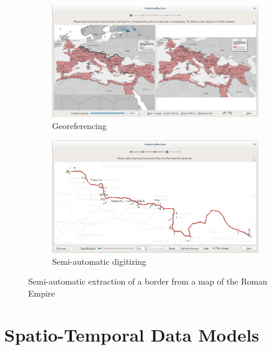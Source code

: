 \begin{figure}[ht]
  \centering
  \begin{subfigure}{0.48\textwidth}
    \centering
    \includegraphics[width=0.95\linewidth]{graphics/basics/hgis/hibo1.png}
    \caption{Georeferencing}
  \end{subfigure}
  \begin{subfigure}{0.48\textwidth}
    \centering
    \includegraphics[width=0.95\linewidth]{graphics/basics/hgis/hibo2.png}
    \caption{Semi-automatic digitizing}
  \end{subfigure}
  \caption{Semi-automatic extraction of a border from a map of the Roman Empire \cite{hibo}}
  \label{fig:hibo}
\end{figure}






\section{Spatio-Temporal Data Models} %
\label{sec:spatio_temporal_data_models}

